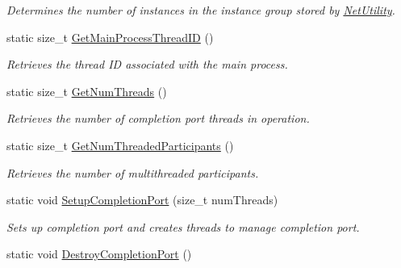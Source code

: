 \begin{DoxyCompactItemize}
\begin{DoxyCompactList}\small\item\em Determines the number of instances in the instance group stored by \hyperlink{class_net_utility}{NetUtility}. \item\end{DoxyCompactList}\item 
static size\_\-t \hyperlink{class_net_utility_aca0bbea45a7bc232fdb88505f97cc016}{GetMainProcessThreadID} ()
\begin{DoxyCompactList}\small\item\em Retrieves the thread ID associated with the main process. \item\end{DoxyCompactList}\item 
static size\_\-t \hyperlink{class_net_utility_a9d121512c68efc81188462f1e0ed4a81}{GetNumThreads} ()
\begin{DoxyCompactList}\small\item\em Retrieves the number of completion port threads in operation. \item\end{DoxyCompactList}\item 
static size\_\-t \hyperlink{class_net_utility_a734842edc567a0fb88147c8bdc08e91a}{GetNumThreadedParticipants} ()
\begin{DoxyCompactList}\small\item\em Retrieves the number of multithreaded participants. \item\end{DoxyCompactList}\item 
static void \hyperlink{class_net_utility_aa6103c1b3d6f5b366c0903ba7b22a625}{SetupCompletionPort} (size\_\-t numThreads)
\begin{DoxyCompactList}\small\item\em Sets up completion port and creates threads to manage completion port. \item\end{DoxyCompactList}\item 
\hypertarget{class_net_utility_a1b2143157ad5b59658f8728cb05faa0c}{
static void \hyperlink{class_net_utility_a1b2143157ad5b59658f8728cb05faa0c}{DestroyCompletionPort} ()}
\label{class_net_utility_a1b2143157ad5b59658f8728cb05faa0c}


\end{DoxyCompactItemize}
